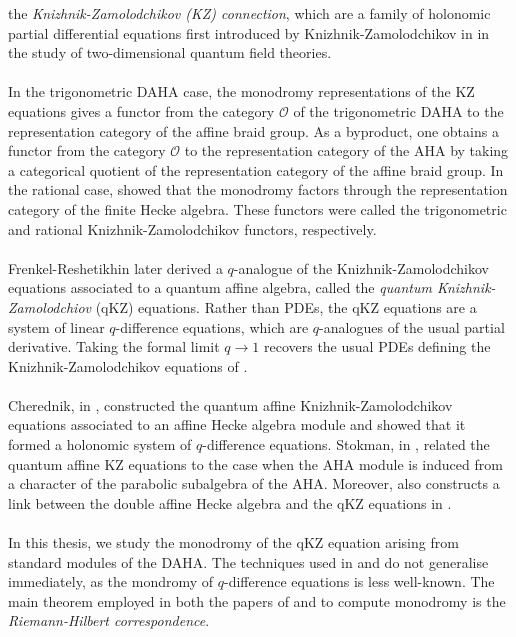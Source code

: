 \documentclass[a4paper]{report}
\theoremstyle{theorem}
\theoremstyle{definition}
\theoremstyle{remark}
\theoremstyle{proposition}
\theoremstyle{conjecture}
\theoremstyle{lemma}
\theoremstyle{corollary}
\theoremstyle{exercise}
\theoremstyle{example}
\newcommand{\mcal}{\mathcal}
\begin{document}
  the \emph{Knizhnik-Zamolodchikov (KZ) connection}, which are a family of holonomic partial differential equations first 
  introduced by Knizhnik-Zamolodchikov in \cite{kz84} in the study of two-dimensional quantum field theories.\\\\
  In the trigonometric DAHA case, the monodromy representations of the KZ equations gives a functor from the 
  category $\mcal{O}$ of the trigonometric DAHA to the representation category of the affine braid group. As a byproduct, 
  one obtains a functor from the category $\mcal{O}$ to the representation category of the AHA by taking a categorical 
  quotient of the representation category of the affine braid group. In the rational case, \cite{ggor03} showed that the monodromy factors through the 
  representation category of the finite Hecke algebra. These functors were called the trigonometric and rational Knizhnik-Zamolodchikov functors, 
  respectively. \\\\
  Frenkel-Reshetikhin \cite{fr92} later derived a $q$-analogue of the Knizhnik-Zamolodchikov equations 
  associated to a quantum affine algebra, called the \emph{quantum Knizhnik-Zamolodchiov} (qKZ) equations.
  Rather than PDEs, the qKZ equations are a system of linear $q$-difference equations, which are 
  $q$-analogues of the usual partial derivative. Taking the formal limit $q\to 1$ recovers the usual PDEs defining the 
  Knizhnik-Zamolodchikov equations of \cite{kz84}.\\\\
  Cherednik, in \cite{che92}, constructed the quantum affine Knizhnik-Zamolodchikov equations associated 
  to an affine Hecke algebra module and showed that it formed a holonomic system of $q$-difference equations.
  Stokman, in \cite{sto10}, related the quantum affine KZ equations to the case when the AHA module is 
  induced from a character of the parabolic subalgebra of the AHA. Moreover, \cite{sto10} also constructs a link between 
  the double affine Hecke algebra and the qKZ equations in \cite[\S 3]{sto10}.\\\\
  In this thesis, we study the monodromy of the qKZ equation arising from standard modules of the DAHA. The techniques 
  used in \cite{vv04} and \cite{ggor03} do not generalise immediately, as the mondromy of $q$-difference equations is 
  less well-known.
  The main theorem employed in both the papers of \cite{vv04} and \cite{ggor03} to compute monodromy is the \emph{Riemann-Hilbert correspondence}.
\end{document}
